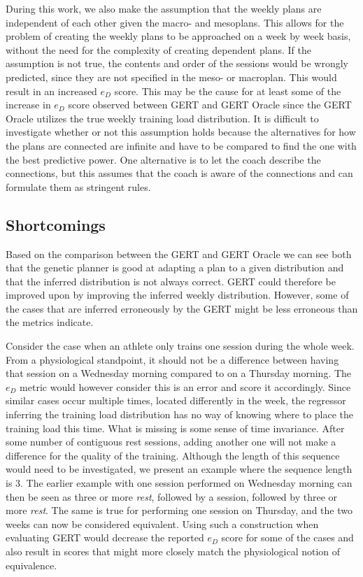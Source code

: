 During this work, we also make the assumption that the weekly plans are independent of each other given the macro- and mesoplans.
This allows for the problem of creating the weekly plans to be approached on a week by week basis, without the need for the complexity of creating dependent plans.
If the assumption is not true, the contents and order of the sessions would be wrongly predicted, since they are not specified in the meso- or macroplan.
This would result in an increased $e_D$ score.
This may be the cause for at least some of the increase in $e_D$ score observed between GERT and GERT Oracle since the GERT Oracle utilizes the true weekly training load distribution.
It is difficult to investigate whether or not this assumption holds because the alternatives for how the plans are connected are infinite and have to be compared to find the one with the best predictive power.
One alternative is to let the coach describe the connections, but this assumes that the coach is aware of the connections and can formulate them as stringent rules.

\subsection{Shortcomings}
Based on the comparison between the GERT and GERT Oracle we can see both that the genetic planner is good at adapting a plan to a given distribution and that the inferred distribution is not always correct.
GERT could therefore be improved upon by improving the inferred weekly distribution.
However, some of the cases that are inferred erroneously by the GERT might be less erroneous than the metrics indicate.

Consider the case when an athlete only trains one session during the whole week.
From a physiological standpoint, it should not be a difference between having that session on a Wednesday morning compared to on a Thursday morning.
The $e_D$ metric would however consider this is an error and score it accordingly.
Since similar cases occur multiple times, located differently in the week, the regressor inferring the training load distribution has no way of knowing where to place the training load this time.
What is missing is some sense of time invariance.
After some number of contiguous rest sessions, adding another one will not make a difference for the quality of the training.
Although the length of this sequence would need to be investigated, we present an example where the sequence length is 3.
The earlier example with one session performed on Wednesday morning can then be seen as three or more \textit{rest}, followed by a session, followed by three or more \textit{rest}.
The same is true for performing one session on Thursday, and the two weeks can now be considered equivalent.
Using such a construction when evaluating GERT would decrease the reported $e_D$ score for some of the cases and also result in scores that might more closely match the physiological notion of equivalence.


